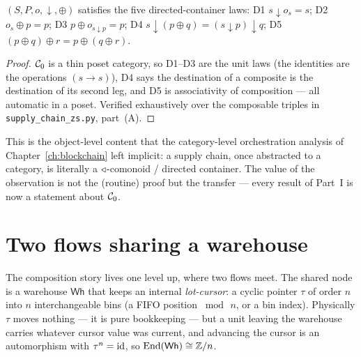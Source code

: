 \begin{proposition}
\label{prop:supply-dlaws}
$(S,P,o,{\downarrow},\oplus)$ satisfies the five directed-container laws:
\textnormal{D1} $s\!\downarrow\! o_s=s$; \textnormal{D2} $o_s\oplus p=p$;
\textnormal{D3} $p\oplus o_{s\downarrow p}=p$;
\textnormal{D4} $s\!\downarrow\!(p\oplus q)=(s\!\downarrow\! p)\!\downarrow\! q$;
\textnormal{D5} $(p\oplus q)\oplus r=p\oplus(q\oplus r)$.
\end{proposition}

\begin{proof}
$\mathcal{C}_0$ is a thin poset category, so D1--D3 are the unit laws (the identities are
the operations $(s\to s)$), D4 says the destination of a composite is the
destination of its second leg, and D5 is associativity of composition --- all
automatic in a poset. Verified exhaustively over the composable triples in
\texttt{supply\_chain\_zs.py}, part~(A).
\end{proof}

This is the object-level content that the category-level orchestration analysis
of Chapter~\ref{ch:blockchain} left implicit: a supply chain, once abstracted to
a category, is literally a $\triangleleft$-comonoid / directed container. The value of the
observation is not the (routine) proof but the transfer --- every result of
Part~I is now a statement about $\mathcal{C}_0$.

\section{Two flows sharing a warehouse}
\label{sec:supply-warehouse}

The composition story lives one level up, where two flows meet. The shared node
is a warehouse $\mathsf{Wh}$ that keeps an internal \emph{lot-cursor}: a cyclic
pointer $\tau$ of order $n$ into $n$ interchangeable bins (a FIFO position
$\bmod\,n$, or a bin index). Physically $\tau$ moves nothing --- it is pure
bookkeeping --- but a unit leaving the warehouse carries whatever cursor value
was current, and advancing the cursor is an automorphism with $\tau^n=\mathrm{id}$, so
$\mathrm{End}(\mathsf{Wh})\cong\mathbb{Z}/n$.

